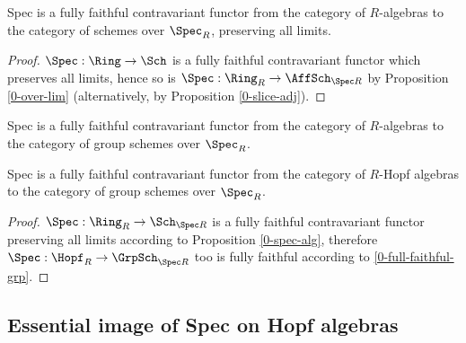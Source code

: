 \begin{proposition}
  \label{0-full-faithful-spec-alg}
  \leanok

  Spec is a fully faithful contravariant functor from the category of $R$-algebras to the category of schemes over $\Spec_R$, preserving all limits.
\end{proposition}
\begin{proof}
  \leanok

  $\Spec : \Ring \to \Sch$ is a fully faithful contravariant functor which preserves all limits, hence so is $\Spec : \Ring_R \to \AffSch_{\Spec R}$ by Proposition \ref{0-over-lim} (alternatively, by Proposition \ref{0-slice-adj}).
\end{proof}


\begin{definition}
  \label{0-spec-hopf}
  \leanok

  Spec is a fully faithful contravariant functor from the category of $R$-algebras to the category of group schemes over $\Spec_R$.
\end{definition}


\begin{proposition}
  \label{0-full-faithful-spec-hopf}
  \leanok

  Spec is a fully faithful contravariant functor from the category of $R$-Hopf algebras to the category of group schemes over $\Spec_R$.
\end{proposition}
\begin{proof}
  \leanok

  $\Spec : \Ring_R \to \Sch_{\Spec R}$ is a fully faithful contravariant functor preserving all limits according to Proposition \ref{0-spec-alg}, therefore $\Spec : \Hopf_R \to \GrpSch_{\Spec R}$ too is fully faithful according to \ref{0-full-faithful-grp}.
\end{proof}


\subsection{Essential image of Spec on Hopf algebras}


